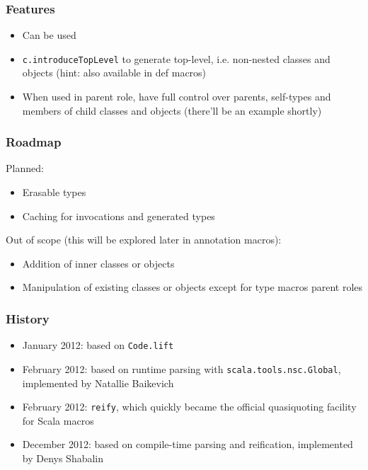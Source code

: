 \documentclass[svgnames,hyperref={bookmarks=false}]{beamer}
\begin{document}
\begin{frame}[fragile]
\frametitle{Features}

\begin{itemize}
\item Can be used 
\item \texttt{c.introduceTopLevel} to generate top-level, i.e. non-nested classes and objects (hint: also available in def macros)
\item When used in parent role, have full control over parents, self-types and members of child classes and objects (there'll be an example shortly)
\end{itemize}
\end{frame}

\begin{frame}[fragile]
\frametitle{Roadmap}

Planned:
\begin{itemize}
\item Erasable types
\item Caching for invocations and generated types
\end{itemize}
\vskip25pt
Out of scope (this will be explored later in annotation macros):
\begin{itemize}
\item Addition of inner classes or objects
\item Manipulation of existing classes or objects except for type macros parent roles
\end{itemize}
\end{frame}

\begin{frame}[fragile]
\frametitle{}

\vskip40pt
\begin{center}
\end{center}
\end{frame}

\begin{frame}[fragile]
\frametitle{History}

\begin{itemize}
\item January 2012:  based on \texttt{Code.lift}
\item February 2012:  based on runtime parsing with \texttt{scala.tools.nsc.Global}, implemented by Natallie Baikevich
\item February 2012: \texttt{reify}, which quickly became the official quasiquoting facility for Scala macros
\item December 2012:  based on compile-time parsing and reification, implemented by Denys Shabalin
\end{itemize}
\end{frame}
\end{document}
